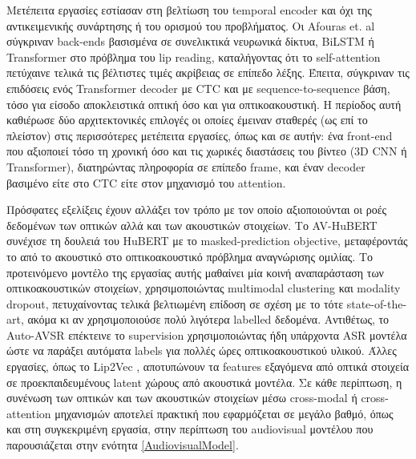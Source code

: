 Μετέπειτα εργασίες εστίασαν στη βελτίωση του temporal encoder και όχι της αντικειμενικής συνάρτησης ή του ορισμού του προβλήματος. Οι Afouras et. al \cite{Afouras18c} σύγκριναν back-ends βασισμένα σε συνελικτικά νευρωνικά δίκτυα, BiLSTM ή Transformer στο πρόβλημα του lip reading, καταλήγοντας ότι το self-attention πετύχαινε τελικά τις βέλτιστες τιμές ακρίβειας σε επίπεδο λέξης. Έπειτα, σύγκριναν τις επιδόσεις ενός Transformer decoder με CTC και με sequence-to-sequence βάση, τόσο για είσοδο αποκλειστικά οπτική όσο και για οπτικοακουστική. Η περίοδος αυτή καθιέρωσε δύο αρχιτεκτονικές επιλογές οι οποίες έμειναν σταθερές (ως επί το πλείστον) στις περισσότερες μετέπειτα εργασίες, όπως και σε αυτήν: ένα front-end που αξιοποιεί τόσο τη χρονική όσο και τις χωρικές διαστάσεις του βίντεο (3D CNN ή Transformer), διατηρώντας πληροφορία σε επίπεδο frame, και έναν decoder βασιμένο είτε στο CTC είτε στον μηχανισμό του attention.

Πρόσφατες εξελίξεις έχουν αλλάξει τον τρόπο με τον οποίο αξιοποιούνται οι ροές δεδομένων των οπτικών αλλά και των ακουστικών στοιχείων. Το AV-HuBERT \cite{shi2022learningaudiovisualspeechrepresentation} συνέχισε τη δουλειά του HuBERT \cite{hsu2021hubertselfsupervisedspeechrepresentation} με το masked-prediction objective, μεταφέροντάς το από το ακουστικό στο οπτικοακουστικό πρόβλημα αναγνώρισης ομιλίας. Το προτεινόμενο μοντέλο της εργασίας αυτής μαθαίνει μία κοινή αναπαράσταση των οπτικοακουστικών στοιχείων, χρησιμοποιώντας multimodal clustering και modality dropout, πετυχαίνοντας τελικά βελτιωμένη επίδοση σε σχέση με το τότε state-of-the-art, ακόμα κι αν χρησιμοποιούσε πολύ λιγότερα labelled δεδομένα. Αντιθέτως, το Auto-AVSR \cite{Ma_2023} επέκτεινε το supervision χρησιμοποιώντας ήδη υπάρχοντα ASR μοντέλα ώστε να παράξει αυτόματα labels για πολλές ώρες οπτικοακουστικού υλικού. Άλλες εργασίες, όπως το Lip2Vec \cite{djilali2023lip2vecefficientrobustvisual}, αποτυπώνουν τα features εξαγόμενα από οπτικά στοιχεία σε προεκπαιδευμένους latent χώρους από ακουστικά μοντέλα. Σε κάθε περίπτωση, η συνένωση των οπτικών και των ακουστικών στοιχείων μέσω cross-modal ή cross-attention μηχανισμών αποτελεί πρακτική που εφαρμόζεται σε μεγάλο βαθμό, όπως και στη συγκεκριμένη εργασία, στην περίπτωση του audiovisual μοντέλου που παρουσιάζεται στην ενότητα \ref{AudiovisualModel}.

